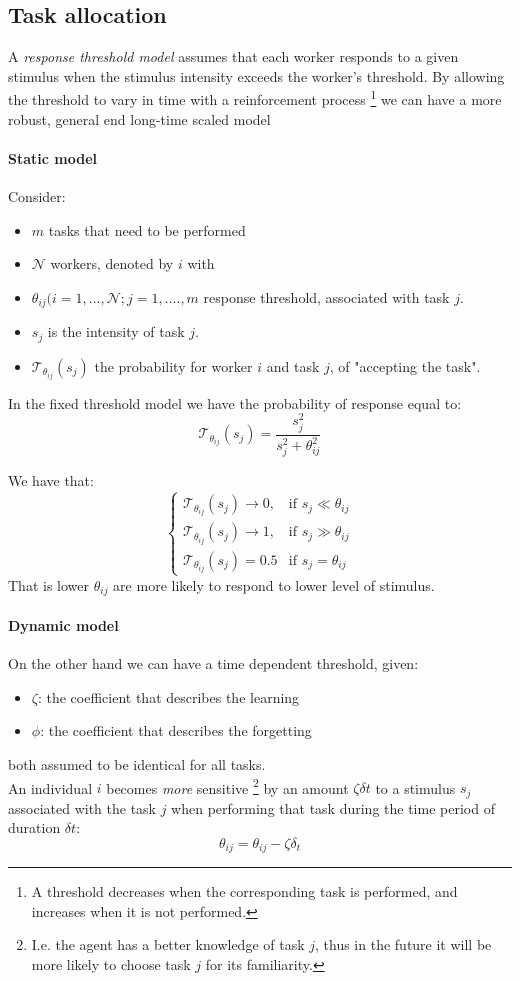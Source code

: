 \documentclass[10pt,a4paper]{article}
\begin{document}
\subsection{Task allocation }
A \textit{response threshold model} assumes that each worker responds to a given stimulus when the stimulus intensity exceeds the worker's threshold. By allowing the threshold to vary in time with a reinforcement process \footnote{A threshold decreases when the corresponding task is performed, and increases when it is not performed.} we can have a more robust, general end long-time scaled model

\paragraph{Static model}
Consider:
\begin{itemize}
\item $m$ tasks that need to be performed
\item $\mathcal{N}$ workers, denoted by $i$ with
\item $\theta_{ij} (i=1,...,\mathcal{N};j=1,....,m$ response threshold, associated with task $j$.
\item $s_j$ is the intensity of task $j$.
\item $\mathcal{T}_{\theta_{ij}}(s_j)$ the probability for worker $i$ and task $j$, of "accepting the task".
\end{itemize}

In the fixed threshold model we have the probability of response equal to:
\[\mathcal{T}_{\theta_{ij}}(s_j)=\frac{s_j^2}{s_j^2+\theta^2_{ij}}\]

We have that:
  \[
\begin{cases} 
\mathcal{T}_{\theta_{ij}}(s_j) \rightarrow 0 , & \mbox{if } s_j \ll \theta_{ij}\\
\mathcal{T}_{\theta_{ij}}(s_j) \rightarrow 1 , & \mbox{if } s_j \gg \theta_{ij}\\
\mathcal{T}_{\theta_{ij}}(s_j) =0.5 & \mbox{if } s_j = \theta_{ij}
\end{cases}
  \]
That is lower $\theta_{ij}$ are more likely to respond to lower level of stimulus.

\paragraph{Dynamic model}

On the other hand we can have a time dependent threshold, given:
\begin{itemize}
\item $\zeta$: the coefficient that describes the learning
\item $\phi$: the coefficient that describes the forgetting
\end{itemize}
both assumed to be identical for all tasks.\\
An individual $i$ becomes \textit{more} sensitive \footnote{I.e. the agent has a better knowledge of task $j$, thus in the future it will be more likely to choose task $j$ for its familiarity.} by an amount $\zeta \delta t$ to a stimulus $s_j$ associated with the task $j$  when performing that task during the time period of duration $\delta t$:
\[\theta_{ij} = \theta_{ij} - \zeta\delta_t\]
\end{document}
